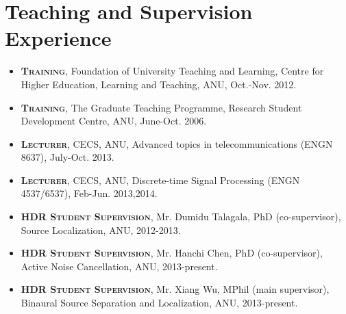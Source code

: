\documentclass[11pt]{article}
\begin{document}
\section*{Teaching and Supervision Experience}
%
\begin{itemize}
%
\item \textsc{\textbf{Training}}, Foundation of University Teaching and Learning, Centre for Higher Education, Learning and Teaching, ANU, Oct.-Nov. 2012.

\item \textsc{\textbf{Training}}, The Graduate Teaching Programme, Research Student Development Centre, ANU,
June-Oct. 2006.

\item \textsc{\textbf{Lecturer}}, CECS, ANU, Advanced topics in telecommunications (ENGN 8637), July-Oct. 2013.

\item \textsc{\textbf{Lecturer}}, CECS, ANU, Discrete-time Signal Processing (ENGN 4537/6537), Feb-Jun. 2013,2014.

\item \textsc{\textbf{HDR Student Supervision}}, Mr. Dumidu Talagala, PhD (co-supervisor), Source Localization, ANU, 2012-2013.

\item \textsc{\textbf{HDR Student Supervision}}, Mr. Hanchi Chen, PhD (co-supervisor), Active Noise Cancellation, ANU, 2013-present.

\item \textsc{\textbf{HDR Student Supervision}}, Mr. Xiang Wu, MPhil (main supervisor), Binaural Source Separation and Localization, ANU, 2013-present.
\end{itemize}


\end{document}

